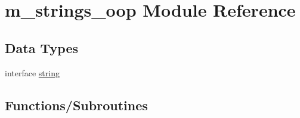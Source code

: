 \hypertarget{namespacem__strings__oop}{}\section{m\+\_\+strings\+\_\+oop Module Reference}
\label{namespacem__strings__oop}
\subsection*{Data Types}
\begin{DoxyCompactItemize}
\item 
interface \hyperlink{structm__strings__oop_1_1string}{string}
\end{DoxyCompactItemize}
\subsection*{Functions/\+Subroutines}
